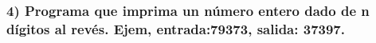 \subsubsection*{4) Programa que imprima un número entero dado de n dígitos al revés. Ejem, entrada:79373, salida: 37397.}